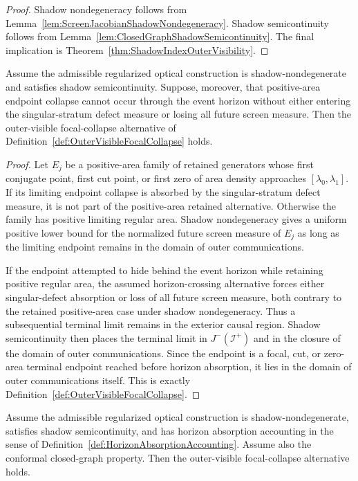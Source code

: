 \begin{proof}
Shadow nondegeneracy follows from Lemma~\ref{lem:ScreenJacobianShadowNondegeneracy}. Shadow semicontinuity follows from Lemma~\ref{lem:ClosedGraphShadowSemicontinuity}. The final implication is Theorem~\ref{thm:ShadowIndexOuterVisibility}.
\end{proof}

\begin{theorem}\label{thm:ShadowIndexOuterVisibility}
Assume the admissible regularized optical construction is shadow-nondegenerate and satisfies shadow semicontinuity. Suppose, moreover, that positive-area endpoint collapse cannot occur through the event horizon without either entering the singular-stratum defect measure or losing all future screen measure. Then the outer-visible focal-collapse alternative of Definition~\ref{def:OuterVisibleFocalCollapse} holds.
\end{theorem}

\begin{proof}
Let $E_j$ be a positive-area family of retained generators whose first conjugate point, first cut point, or first zero of area density approaches $[\lambda_0,\lambda_1]$. If its limiting endpoint collapse is absorbed by the singular-stratum defect measure, it is not part of the positive-area retained alternative. Otherwise the family has positive limiting regular area. Shadow nondegeneracy gives a uniform positive lower bound for the normalized future screen measure of $E_j$ as long as the limiting endpoint remains in the domain of outer communications.

If the endpoint attempted to hide behind the event horizon while retaining positive regular area, the assumed horizon-crossing alternative forces either singular-defect absorption or loss of all future screen measure, both contrary to the retained positive-area case under shadow nondegeneracy. Thus a subsequential terminal limit remains in the exterior causal region. Shadow semicontinuity then places the terminal limit in $J^-(\mathscr I^+)$ and in the closure of the domain of outer communications. Since the endpoint is a focal, cut, or zero-area terminal endpoint reached before horizon absorption, it lies in the domain of outer communications itself. This is exactly Definition~\ref{def:OuterVisibleFocalCollapse}.
\end{proof}

\begin{corollary}\label{cor:HorizonAccountingOuterVisibility}
Assume the admissible regularized optical construction is shadow-nondegenerate, satisfies shadow semicontinuity, and has horizon absorption accounting in the sense of Definition~\ref{def:HorizonAbsorptionAccounting}. Assume also the conformal closed-graph property. Then the outer-visible focal-collapse alternative holds.
\end{corollary}

